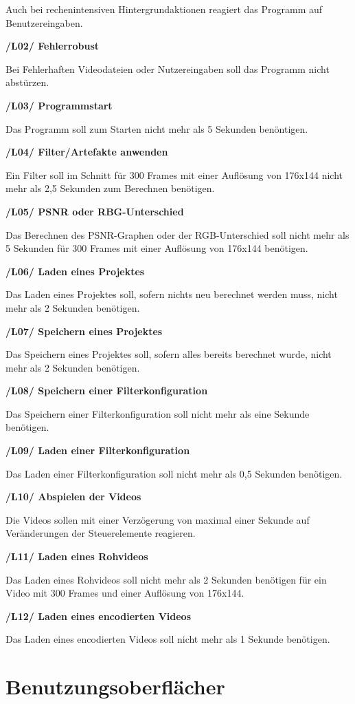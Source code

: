 \documentclass[parskip=full]{scrartcl}
\begin{document}
Auch bei rechenintensiven Hintergrundaktionen reagiert das Programm auf Benutzereingaben.

\textbf{/L02/ Fehlerrobust}

Bei Fehlerhaften Videodateien oder Nutzereingaben soll das Programm nicht abstürzen.

\textbf{/L03/ Programmstart}

Das Programm soll zum Starten nicht mehr als 5 Sekunden benöntigen.

\textbf{/L04/ Filter/Artefakte anwenden}

Ein Filter soll im Schnitt für 300 Frames mit einer Auflösung von 176x144 nicht mehr als 2,5 Sekunden zum Berechnen benötigen.

\textbf{/L05/ PSNR oder RBG-Unterschied}

Das Berechnen des PSNR-Graphen oder der RGB-Unterschied soll nicht mehr als 5 Sekunden für 300 Frames mit einer Auflösung von 176x144 benötigen.

\textbf{/L06/ Laden eines Projektes}

Das Laden eines Projektes soll, sofern nichts neu berechnet werden muss, nicht mehr als 2 Sekunden benötigen.

\textbf{/L07/ Speichern eines Projektes}

Das Speichern eines Projektes soll, sofern alles bereits berechnet wurde, nicht mehr als 2 Sekunden benötigen.

\textbf{/L08/ Speichern einer Filterkonfiguration}

Das Speichern einer Filterkonfiguration soll nicht mehr als eine Sekunde benötigen.

\textbf{/L09/ Laden einer Filterkonfiguration}

Das Laden einer Filterkonfiguration soll nicht mehr als 0,5 Sekunden benötigen.

\newpage
\textbf{/L10/ Abspielen der Videos}

Die Videos sollen mit einer Verzögerung von maximal einer Sekunde auf Veränderungen der Steuerelemente reagieren.

\textbf{/L11/ Laden eines Rohvideos}

Das Laden eines Rohvideos soll nicht mehr als 2 Sekunden benötigen für ein Video mit 300 Frames und einer Auflösung von 176x144.

\textbf{/L12/ Laden eines encodierten Videos}

Das Laden eines encodierten Videos soll nicht mehr als 1 Sekunde benötigen.
\newpage
\section{Benutzungsoberflächer}
\end{document}

